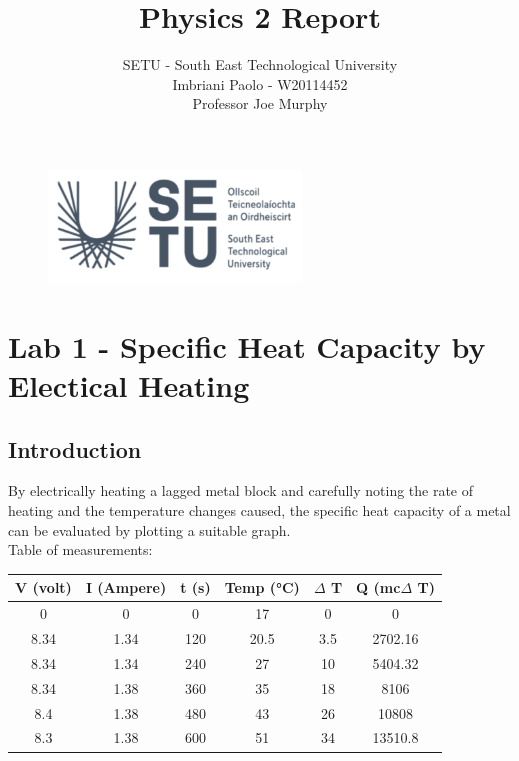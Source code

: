 \documentclass[a4paper]{article}
\title{Physics 2 Report}
\author{SETU - South East Technological University\\Imbriani Paolo - W20114452\\Professor Joe Murphy}
\begin{document}
\begin{figure}
    \centering
    \includegraphics[width=0.6\textwidth]{SETU.png}
    \label{fig:centered-image}
\end{figure}

\maketitle 

\pagebreak

\tableofcontents

\pagebreak

\section{Lab 1 -  Specific Heat Capacity by Electical Heating}

\subsection{Introduction}

By electrically heating a lagged metal block and carefully noting the rate of heating 
and the temperature changes caused, the specific heat capacity of a metal can be evaluated
by plotting a suitable graph.
\\
Table of measurements:

\begin{center}
    
\begin{tabular}{c|c|c|c|c|c}
    \textbf{V (volt)} & \textbf{I (Ampere)} & \textbf{t (s)} & \textbf{Temp (°C)} & \textbf{$\Delta$ T} & \textbf{Q (mc$\Delta$ T)} \\
    \hline
    0 & 0 & 0 & 17 & 0 & 0\\
    8.34 & 1.34 & 120 & 20.5 & 3.5 & 2702.16\\
    8.34 & 1.34 & 240 & 27 & 10 & 5404.32\\
    8.34 & 1.38 & 360 & 35 & 18 & 8106 \\
    8.4 & 1.38 & 480 & 43 & 26 &  10808\\
    8.3 & 1.38 & 600 & 51 & 34 & 13510.8\\
    
\end{tabular}

\end{center}
\end{document}
